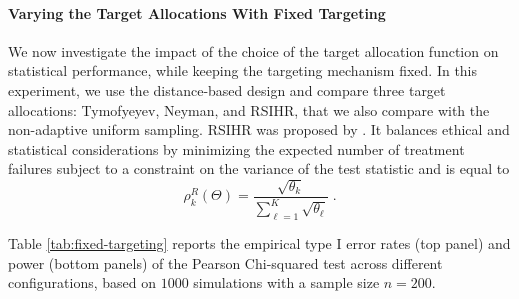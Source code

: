 \documentclass[11pt]{article}
\theoremstyle{plain}
\theoremstyle{definition}
\begin{document}


\paragraph*{Varying the Target Allocations With Fixed Targeting}

We now investigate the impact of the choice of the target allocation function on statistical performance, while keeping the targeting mechanism fixed. In this experiment, we use the distance-based design and compare three target allocations: Tymofyeyev, Neyman, and RSIHR, that we also compare with the non-adaptive uniform sampling. RSIHR was proposed by
\cite{Rosenberger01Opt}. It balances ethical and statistical considerations by
minimizing the expected number of treatment failures subject to a constraint
on the variance of the test statistic and is equal to
\[\rho_k^R(\Theta) = \frac{\sqrt{\theta_k}}{\sum_{\ell=1}^{K}\sqrt{\theta_{\ell}}}\;.\]

Table \ref{tab:fixed-targeting} reports the empirical type I error rates (top panel) and power (bottom panels) of the Pearson Chi-squared test across different configurations, based on $1000$ simulations with a sample size $n=200$.
\end{document}
